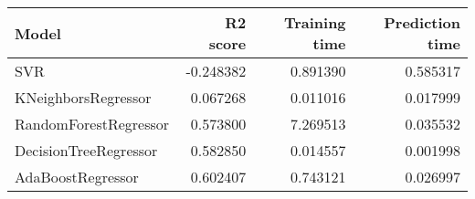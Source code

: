 \begin{tabular}{lrrr}
\toprule
Model & R2 score & Training time & Prediction time \\
\midrule
SVR & -0.248382 & 0.891390 & 0.585317 \\
KNeighborsRegressor & 0.067268 & 0.011016 & 0.017999 \\
RandomForestRegressor & 0.573800 & 7.269513 & 0.035532 \\
DecisionTreeRegressor & 0.582850 & 0.014557 & 0.001998 \\
AdaBoostRegressor & 0.602407 & 0.743121 & 0.026997 \\
\bottomrule
\end{tabular}
